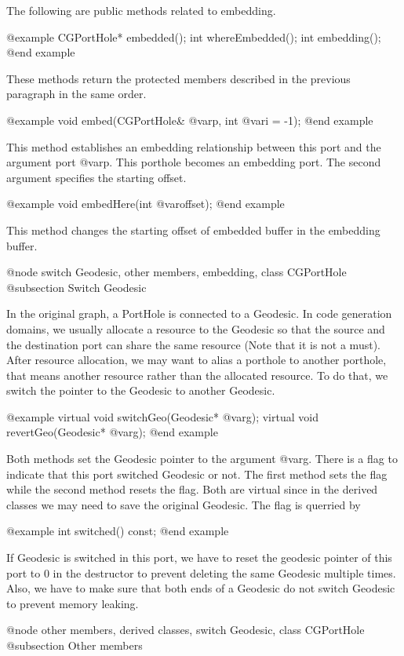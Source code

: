 The following are public methods related to embedding.

@example
CGPortHole* embedded();
int whereEmbedded();
int embedding();
@end example

These methods return the protected members described in the previous
paragraph in the same order.

@example
void embed(CGPortHole& @var{p}, int @var{i} = -1);
@end example

This method establishes an embedding relationship between this port and
the argument port @var{p}. This porthole becomes an embedding port.
The second argument specifies the starting offset.

@example
void embedHere(int @var{offset});
@end example

This method changes the starting offset of embedded buffer in the embedding
buffer.

@node switch Geodesic, other members, embedding, class CGPortHole
@subsection Switch Geodesic

In the original graph, a PortHole is connected to a Geodesic. In code
generation domains, we usually allocate a resource to the Geodesic so that
the source and the destination port can share the same resource (Note that
it is not a must). After resource allocation, we may want to alias
a porthole to another porthole, that means another resource rather than
the allocated resource. To do that, we switch
the pointer to the Geodesic to another Geodesic.

@example
virtual void switchGeo(Geodesic* @var{g});
virtual void revertGeo(Geodesic* @var{g});
@end example

Both methods set the Geodesic pointer to the argument @var{g}. There is a flag
to indicate that this port switched Geodesic or not. The first method
sets the flag while the second method resets the flag. Both are virtual since
in the derived classes we may need to save the original Geodesic.
The flag is querried by

@example
int switched() const;
@end example

If Geodesic is switched in this port, we have to reset the geodesic
pointer of this port to 0 in the destructor to prevent deleting the
same Geodesic multiple times. Also, we have to make sure that
both ends of a Geodesic do not switch Geodesic to prevent memory leaking.

@node other members, derived classes, switch Geodesic, class CGPortHole
@subsection Other members

